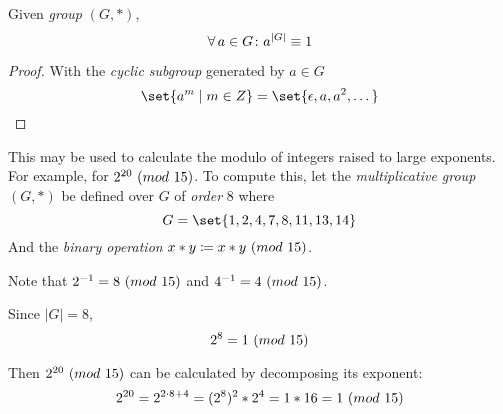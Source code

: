 \begin{proposition}
    Given \textit{group} $(G, \ast)$,
    \begin{equation}
        \operatorname{\forall} a \in G \colon a^{\lvert G \rvert} \equiv 1
    \end{equation}
\end{proposition}

\begin{proof}
    With the \textit{cyclic subgroup} generated by $a \in G$
    \begin{equation}
        \set{a^m \mid m \in \Int} = \set{\epsilon, a, a^2, \dots}
    \end{equation}
\end{proof}

\begin{remark}
    This may be used to calculate the modulo of integers raised to large exponents. For example, for $2^{20} \ (\relax{mod}\ 15)$. To compute this, let the \textit{multiplicative group} $(G, \ast)$ be defined over $G$ of \textit{order} $8$ where
    \begin{equation}
        G = \set{1, 2, 4, 7, 8, 11, 13, 14}
    \end{equation}
    And the \textit{binary operation} $x \ast y \coloneqq x \ast y \ (\relax{mod}\ 15)$.
    
    Note that ${2}^{-1} = 8 \ (\relax{mod}\ 15)$ and ${4}^{-1} = 4 \ (\relax{mod}\ 15)$.
    
    Since $\lvert G \rvert = 8$,
    \begin{equation}
        2^8 = 1 \ (\relax{mod}\ 15)
    \end{equation}
    
    Then $2^{20} \ (\relax{mod}\ 15)$ can be calculated by decomposing its exponent:
    \begin{equation}
        2^{20} = 2^{2 \cdot 8 + 4} = (2^8)^2 \ast 2^4 = 1 \ast 16 = 1 \ (\relax{mod}\ 15)
    \end{equation}
\end{remark}
